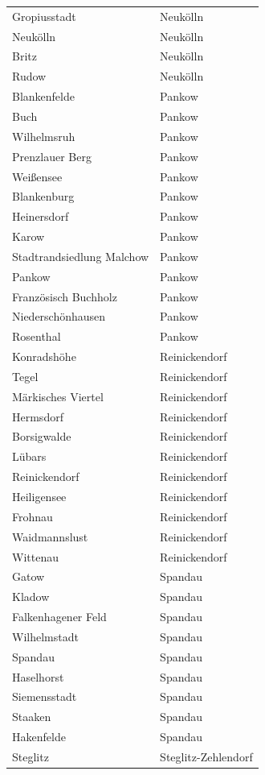 \begin{table}[H]
\begin{tabular}{ll}
  Gropiusstadt & Neukölln \\ 
  Neukölln & Neukölln \\ 
  Britz & Neukölln \\ 
  Rudow & Neukölln \\ 
  Blankenfelde & Pankow \\ 
  Buch & Pankow \\ 
  Wilhelmsruh & Pankow \\ 
  Prenzlauer Berg & Pankow \\ 
  Weißensee & Pankow \\ 
  Blankenburg & Pankow \\ 
  Heinersdorf & Pankow \\ 
  Karow & Pankow \\ 
  Stadtrandsiedlung Malchow & Pankow \\ 
  Pankow & Pankow \\ 
  Französisch Buchholz & Pankow \\ 
  Niederschönhausen & Pankow \\ 
  Rosenthal & Pankow \\ 
  Konradshöhe & Reinickendorf \\ 
  Tegel & Reinickendorf \\ 
  Märkisches Viertel & Reinickendorf \\ 
  Hermsdorf & Reinickendorf \\ 
  Borsigwalde & Reinickendorf \\ 
  Lübars & Reinickendorf \\ 
  Reinickendorf & Reinickendorf \\ 
  Heiligensee & Reinickendorf \\ 
  Frohnau & Reinickendorf \\ 
  Waidmannslust & Reinickendorf \\ 
  Wittenau & Reinickendorf \\ 
  Gatow & Spandau \\ 
  Kladow & Spandau \\ 
  Falkenhagener Feld & Spandau \\ 
  Wilhelmstadt & Spandau \\ 
  Spandau & Spandau \\ 
  Haselhorst & Spandau \\ 
  Siemensstadt & Spandau \\ 
  Staaken & Spandau \\ 
  Hakenfelde & Spandau \\ 
  Steglitz & Steglitz-Zehlendorf \\ 

\end{tabular}
\end{table}

